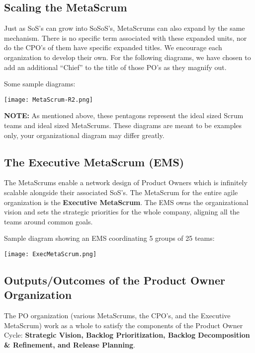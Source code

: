 \documentclass[12pt,a4paper,parskip=full]{scrartcl}
\begin{document}
\subsection{Scaling the MetaScrum}
Just as SoS's can grow into SoSoS's, MetaScrums can also expand by the same
mechanism. There is no specific term associated with these expanded units,
nor do the CPO's of them have specific expanded titles. We encourage each
organization to develop their own. For the following diagrams, we have
chosen to add an additional ``Chief'' to the title of those PO's as they
magnify out.

Some sample diagrams:

\texttt{[image: MetaScrum-R2.png]}

\textbf{NOTE:} As mentioned above, these pentagons represent the ideal
sized Scrum teams and ideal sized MetaScrums. These diagrams are meant to
be examples only, your organizational diagram may differ greatly.

\subsection{The Executive MetaScrum (EMS)}
The MetaScrums enable a network design of Product Owners which is
infinitely scalable alongside their associated SoS's. The MetaScrum for the
entire agile organization is the \textbf{Executive MetaScrum}. The EMS owns
the organizational vision and sets the strategic priorities for the whole
company, aligning all the teams around common goals.

Sample diagram showing an EMS coordinating 5 groups of 25 teams:

\texttt{[image: ExecMetaScrum.png]}

\subsection{Outputs/Outcomes of the Product Owner Organization}
The PO organization (various MetaScrums, the CPO's, and the Executive
MetaScrum) work as a whole to satisfy the components of the Product Owner
Cycle: \textbf{Strategic Vision, Backlog Prioritization, Backlog
Decomposition \& Refinement, and Release Planning}.
\end{document}
